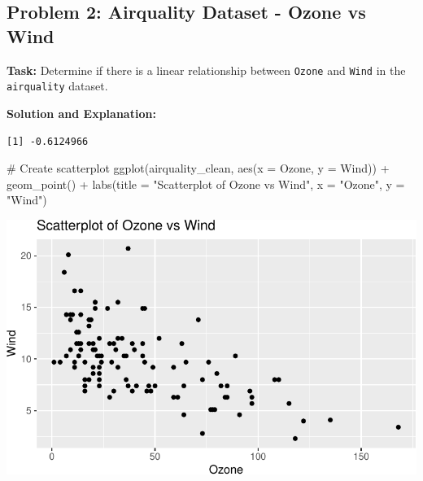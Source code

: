 \documentclass[
  letterpaper,
  DIV=11,
  numbers=noendperiod]{scrreprt}
\newenvironment{Shaded}{\begin{snugshade}}{\end{snugshade}}
\newcommand{\AttributeTok}[1]{\textcolor[rgb]{0.40,0.45,0.13}{#1}}
\newcommand{\CommentTok}[1]{\textcolor[rgb]{0.37,0.37,0.37}{#1}}
\newcommand{\FunctionTok}[1]{\textcolor[rgb]{0.28,0.35,0.67}{#1}}
\newcommand{\NormalTok}[1]{\textcolor[rgb]{0.00,0.23,0.31}{#1}}
\newcommand{\OtherTok}[1]{\textcolor[rgb]{0.00,0.23,0.31}{#1}}
\newcommand{\SpecialCharTok}[1]{\textcolor[rgb]{0.37,0.37,0.37}{#1}}
\newcommand{\StringTok}[1]{\textcolor[rgb]{0.13,0.47,0.30}{#1}}
\begin{document}
\subsection*{Problem 2: Airquality Dataset - Ozone vs
Wind}\label{problem-2-airquality-dataset---ozone-vs-wind}

\textbf{Task:} Determine if there is a linear relationship between
\texttt{Ozone} and \texttt{Wind} in the \texttt{airquality} dataset.

\textbf{Solution and Explanation:}

\begin{Shaded}
\end{Shaded}

\begin{verbatim}
[1] -0.6124966
\end{verbatim}

\begin{Shaded}
\begin{Highlighting}[]
\CommentTok{\# Create scatterplot}
\FunctionTok{ggplot}\NormalTok{(airquality\_clean, }\FunctionTok{aes}\NormalTok{(}\AttributeTok{x =}\NormalTok{ Ozone, }\AttributeTok{y =}\NormalTok{ Wind)) }\SpecialCharTok{+}
  \FunctionTok{geom\_point}\NormalTok{() }\SpecialCharTok{+}
  \FunctionTok{labs}\NormalTok{(}\AttributeTok{title =} \StringTok{"Scatterplot of Ozone vs Wind"}\NormalTok{, }\AttributeTok{x =} \StringTok{"Ozone"}\NormalTok{, }\AttributeTok{y =} \StringTok{"Wind"}\NormalTok{)}
\end{Highlighting}
\end{Shaded}

\includegraphics{Scatterplots_and_Correlation_files/figure-pdf/unnamed-chunk-7-1.pdf}
\end{document}
